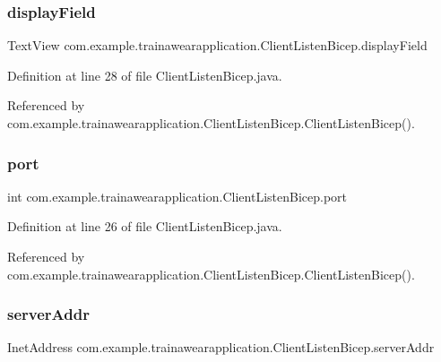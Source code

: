 \subsubsection{\texorpdfstring{displayField}{displayField}}
{\footnotesize\ttfamily Text\+View com.\+example.\+trainawearapplication.\+Client\+Listen\+Bicep.\+display\+Field\hspace{0.3cm}{\ttfamily [private]}}



Definition at line 28 of file Client\+Listen\+Bicep.\+java.



Referenced by com.\+example.\+trainawearapplication.\+Client\+Listen\+Bicep.\+Client\+Listen\+Bicep().

\mbox{\label{classcom_1_1example_1_1trainawearapplication_1_1_client_listen_bicep_a5277e5a6fa795cd86dcc35b08952b17c}} 
\subsubsection{\texorpdfstring{port}{port}}
{\footnotesize\ttfamily int com.\+example.\+trainawearapplication.\+Client\+Listen\+Bicep.\+port\hspace{0.3cm}{\ttfamily [private]}}



Definition at line 26 of file Client\+Listen\+Bicep.\+java.



Referenced by com.\+example.\+trainawearapplication.\+Client\+Listen\+Bicep.\+Client\+Listen\+Bicep().

\mbox{\label{classcom_1_1example_1_1trainawearapplication_1_1_client_listen_bicep_a02882f0c88f5713407dbf2630e1909ff}} 
\subsubsection{\texorpdfstring{serverAddr}{serverAddr}}
{\footnotesize\ttfamily Inet\+Address com.\+example.\+trainawearapplication.\+Client\+Listen\+Bicep.\+server\+Addr}



